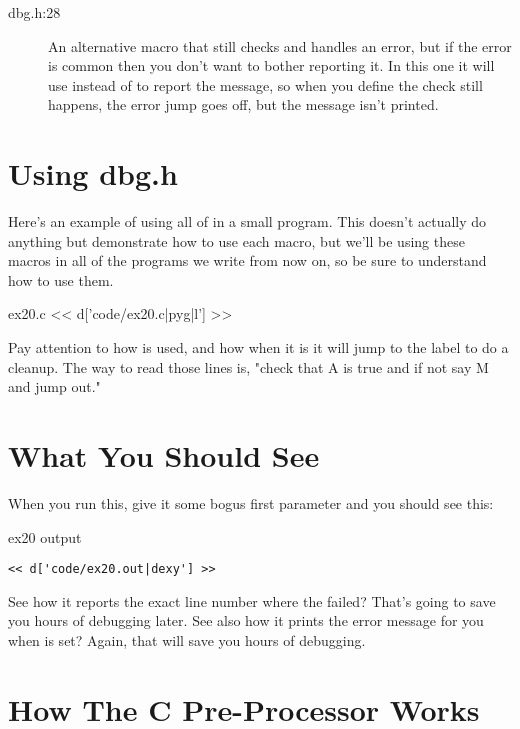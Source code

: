 \begin{description}
\item[dbg.h:28] An alternative macro  that still checks and
    handles an error, but if the error is common then you don't want to bother
    reporting it.  In this one it will use  instead of 
    to report the message, so when you define  the check still
    happens, the error jump goes off, but the message isn't printed.
\end{description}

\section{Using dbg.h}

Here's an example of using all of  in a small program.
This doesn't actually do anything but demonstrate how to use each
macro, but we'll be using these macros in all of the programs we
write from now on, so be sure to understand how to use them.

\begin{code}{ex20.c}
<< d['code/ex20.c|pyg|l'] >>
\end{code}

Pay attention to how  is used, and how when it is
 it will jump to the  label to do a cleanup.
The way to read those lines is, "check that A is true and if not say M
and jump out."

\section{What You Should See}

When you run this, give it some bogus first parameter and you should see
this:

\begin{code}{ex20 output}
\begin{lstlisting}
<< d['code/ex20.out|dexy'] >>
\end{lstlisting}
\end{code}

See how it reports the exact line number where the  failed?
That's going to save you hours of debugging later.  See also how it 
prints the error message for you when  is set? Again,
that will save you hours of debugging.

\section{How The C Pre-Processor Works}

